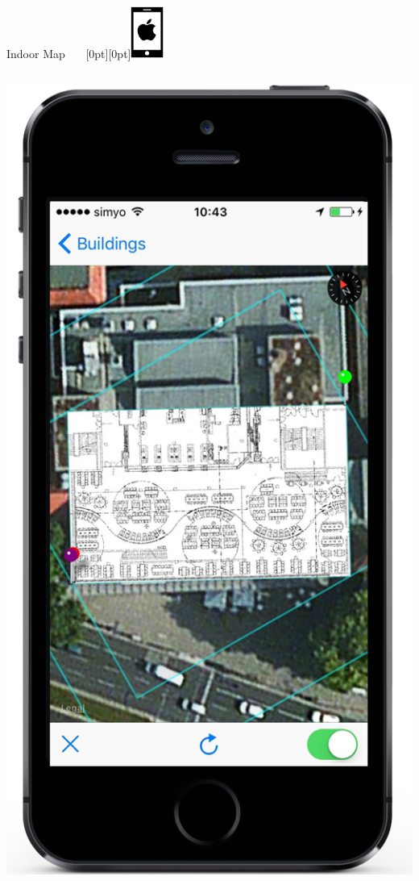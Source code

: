 \documentclass[11pt]{beamer}
\begin{document}
\begin{frame}{Indoor Map ~~~\raisebox{-10pt}[0pt][0pt]{\includegraphics[width=0.08\textwidth]{tech-stack-apple}}}
\begin{columns}[T]
\begin{column}{.4\textwidth}
  \includegraphics[scale=0.25]{mapsecondstep}
  \end{column}
\end{columns}

\end{frame}
\end{document}

